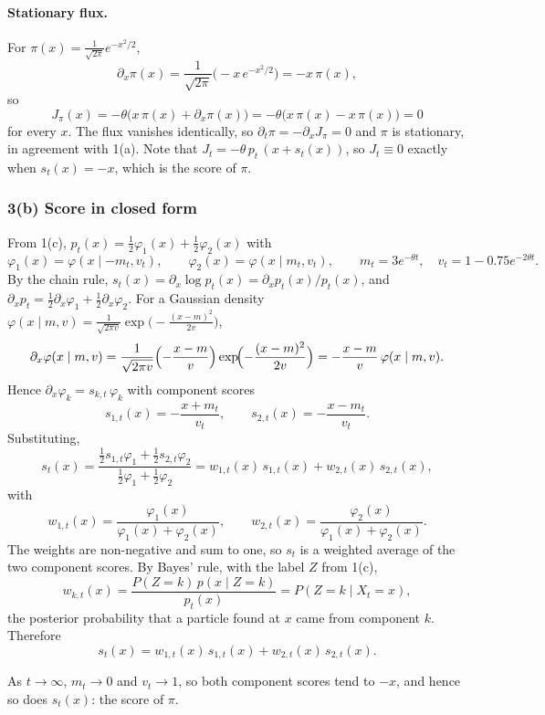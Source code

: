 \documentclass[11pt]{article}
\begin{document}
\paragraph{Stationary flux.} For $\pi(x) = \frac{1}{\sqrt{2\pi}}e^{-x^2/2}$,
\[
\partial_x\pi(x) = \frac{1}{\sqrt{2\pi}}\bigl(-x\,e^{-x^2/2}\bigr) = -x\,\pi(x),
\]
so
\[
J_\pi(x) = -\theta\bigl(x\,\pi(x) + \partial_x\pi(x)\bigr) = -\theta\bigl(x\,\pi(x) - x\,\pi(x)\bigr) = 0
\]
for every $x$. The flux vanishes identically, so $\partial_t\pi = -\partial_x J_\pi = 0$ and $\pi$ is stationary, in agreement with 1(a).
Note that $J_t = -\theta\,p_t\,(x + s_t(x))$, so $J_t\equiv0$ exactly when $s_t(x) = -x$, which is the score of $\pi$.

\subsubsection*{3(b) Score in closed form}

From 1(c), $p_t(x) = \tfrac12\varphi_1(x) + \tfrac12\varphi_2(x)$ with
\[
\varphi_1(x) = \varphi(x\mid -m_t, v_t),\qquad \varphi_2(x) = \varphi(x\mid m_t, v_t),\qquad m_t = 3e^{-\theta t},\quad v_t = 1-0.75e^{-2\theta t}.
\]
By the chain rule, $s_t(x) = \partial_x\log p_t(x) = \partial_x p_t(x)/p_t(x)$, and
$\partial_x p_t = \tfrac12\partial_x\varphi_1 + \tfrac12\partial_x\varphi_2$.
For a Gaussian density $\varphi(x\mid m,v) = \frac{1}{\sqrt{2\pi v}}\exp\!\bigl(-\frac{(x-m)^2}{2v}\bigr)$,
\[
\partial_x\varphi(x\mid m,v) = \frac{1}{\sqrt{2\pi v}}\Bigl(-\frac{x-m}{v}\Bigr)\exp\!\Bigl(-\frac{(x-m)^2}{2v}\Bigr) = -\frac{x-m}{v}\,\varphi(x\mid m,v).
\]
Hence $\partial_x\varphi_k = s_{k,t}\,\varphi_k$ with component scores
\[
s_{1,t}(x) = -\frac{x+m_t}{v_t},\qquad s_{2,t}(x) = -\frac{x-m_t}{v_t}.
\]
Substituting,
\[
s_t(x) = \frac{\tfrac12 s_{1,t}\varphi_1 + \tfrac12 s_{2,t}\varphi_2}{\tfrac12\varphi_1 + \tfrac12\varphi_2}
= w_{1,t}(x)\,s_{1,t}(x) + w_{2,t}(x)\,s_{2,t}(x),
\]
with
\[
w_{1,t}(x) = \frac{\varphi_1(x)}{\varphi_1(x)+\varphi_2(x)},\qquad w_{2,t}(x) = \frac{\varphi_2(x)}{\varphi_1(x)+\varphi_2(x)} .
\]
The weights are non-negative and sum to one, so $s_t$ is a weighted average of the two component scores.
By Bayes' rule, with the label $Z$ from 1(c),
\[
w_{k,t}(x) = \frac{P(Z=k)\,p(x\mid Z=k)}{p_t(x)} = P(Z=k\mid X_t = x),
\]
the posterior probability that a particle found at $x$ came from component $k$. Therefore
\[
\boxed{s_t(x) = w_{1,t}(x)\,s_{1,t}(x) + w_{2,t}(x)\,s_{2,t}(x).}
\]

As $t\to\infty$, $m_t\to0$ and $v_t\to1$, so both component scores tend to $-x$, and hence so does $s_t(x)$: the
score of $\pi$.
\end{document}

